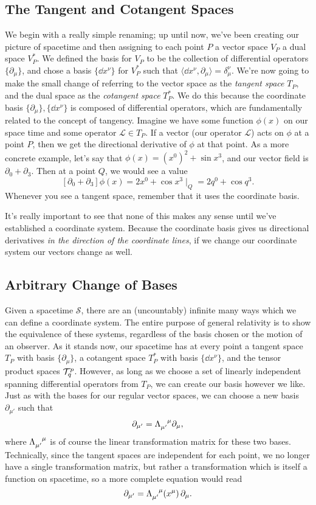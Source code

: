 \subsection{The Tangent and Cotangent Spaces}
We begin with a really simple renaming; up until now, we've been creating our picture of spacetime and then assigning to each point $P$ a vector space $V_P$ a dual space $V^*_P$.
We defined the basis for $V_P$ to be the collection of differential operators $\{\partial_\mu\}$, and chose a basis $\{\dd{x}^\nu\}$ for $V^*_P$ such that $\langle \dd{x}^\nu, \partial_\mu \rangle = \delta^\nu_\mu$.
We're now going to make the small change of referring to the vector space as the \emph{tangent space} $T_P$, and the dual space as the \emph{cotangent space} $T^*_P$.
We do this because the coordinate basis $\{\partial_\mu\},\{\dd{x}^\nu\}$ is composed of differential operators, which are fundamentally related to the concept of tangency.
Imagine we have some function $\phi(x)$ on our space time and some operator $\mathcal{L} \in T_P$.
If a vector (our operator $\mathcal{L}$) acts on $\phi$ at a point $P$, then we get the directional derivative of $\phi$ at that point.
As a more concrete example, let's say that $\phi(x) = (x^0)^2 + \sin x^3$, and our vector field is $\partial_0 + \partial_3$. Then at a point $Q$, we would see a value
\[ [\partial_0 + \partial_3]\phi(x) = {2x^0 + \cos x^3\mid_Q} = 2q^0 + \cos q^3. \]
Whenever you see a tangent space, remember that it uses the coordinate basis.

It's really important to see that none of this makes any sense until we've established a coordinate system.
Because the coordinate basis gives us directional derivatives \emph{in the direction of the coordinate lines}, if we change our coordinate system our vectors change as well.

\subsection{Arbitrary Change of Bases}
Given a spacetime $\mathcal{S}$, there are an (uncountably) infinite many ways which we can define a coordinate system.
The entire purpose of general relativity is to show the equivalence of these systems, regardless of the basis chosen or the motion of an observer.
As it stands now, our spacetime has at every point a tangent space $T_P$ with basis $\{\partial_\mu\}$, a cotangent space $T^*_P$ with basis $\{\dd{x}^\nu\}$, and the tensor product spaces $\mathcal{T}^p_q$.
However, as long as we choose a set of linearly independent spanning differential operators from $T_P$, we can create our basis however we like.
Just as with the bases for our regular vector spaces, we can choose a new basis $\partial_{\mu'}$ such that
\[ \partial_{\mu'} = \tensor{\Lambda}{_{\mu'}^\mu}\partial_\mu, \]
where $\tensor{\Lambda}{_{\mu'}^\mu}$ is of course the linear transformation matrix for these two bases.
Technically, since the tangent spaces are independent for each point, we no longer have a single transformation matrix, but rather a transformation which is itself a function on spacetime, so a more complete equation would read
\[ \partial_{\mu'} = \tensor{\Lambda}{_{\mu'}^\mu} (x^\mu)\,\partial_\mu. \]

